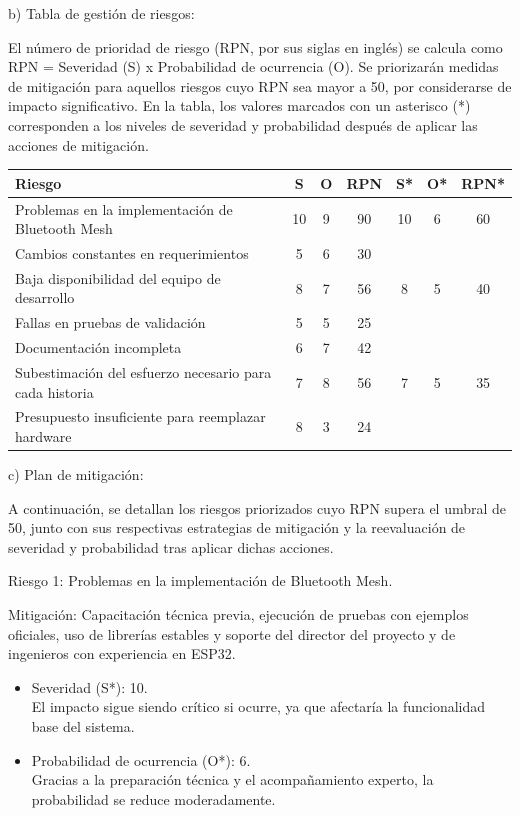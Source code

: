 \documentclass[
11pt, %
]{charter}
\begin{document}
b) Tabla de gestión de riesgos:


El número de prioridad de riesgo (RPN, por sus siglas en inglés) se calcula como RPN = Severidad (S) x Probabilidad de ocurrencia (O). Se priorizarán medidas de mitigación para aquellos riesgos cuyo RPN sea mayor a 50, por considerarse de impacto significativo. En la tabla, los valores marcados con un asterisco (*) corresponden a los niveles de severidad y probabilidad después de aplicar las acciones de mitigación.

\begin{table}[htpb]
\centering
\begin{tabularx}{\linewidth}{@{}|X|c|c|c|c|c|c|@{}}
\hline
\rowcolor[HTML]{C0C0C0} 
Riesgo & S & O & RPN & S* & O* & RPN* \\ \hline
Problemas en la implementación de Bluetooth Mesh       &
10   & 9  &  90   & 10    & 6   & 60     \\ \hline
Cambios constantes en requerimientos       &   
5   & 6  &  30   &    &    &      \\ \hline
Baja disponibilidad del equipo de desarrollo       &
8    & 7  &  56   & 8   & 5   & 40     \\ \hline
Fallas en pruebas de validación       &   
5    & 5  &  25   &    &    &      \\ \hline
Documentación incompleta       &   
6    & 7  &  42   &    &    &      \\ \hline
Subestimación del esfuerzo necesario para cada historia     &
7    & 8  &  56  & 7    & 5   & 35 \\ \hline
Presupuesto insuficiente para reemplazar hardware       & 
8    & 3  &  24  &    &    &      \\ \hline
\end{tabularx}%
\end{table}

c) Plan de mitigación:

A continuación, se detallan los riesgos priorizados cuyo RPN supera el umbral de 50, junto con sus respectivas estrategias de mitigación y la reevaluación de severidad y probabilidad tras aplicar dichas acciones.

Riesgo 1: Problemas en la implementación de Bluetooth Mesh.

Mitigación: Capacitación técnica previa, ejecución de pruebas con ejemplos oficiales, uso de librerías estables y soporte del director del proyecto y de ingenieros con experiencia en ESP32.

\begin{itemize}
	\item Severidad (S*): 10. \\
	El impacto sigue siendo crítico si ocurre, ya que afectaría la funcionalidad base del sistema.
	\item Probabilidad de ocurrencia (O*): 6. \\
	Gracias a la preparación técnica y el acompañamiento experto, la probabilidad se reduce moderadamente.
\end{itemize}   
\end{document}
